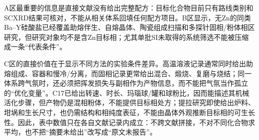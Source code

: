 A区最重要的信息是直接文献没有给出完整配方：目标化合物目前只有路线类别和SCXRD结果可核对，不能从相关体系回填任何配方项目\cite{ababaikeri2024ba5y12zn}。B区显示，无Zn的同类Ba--Y硅酸盐已经覆盖助熔伴生、自熔晶体、陶瓷组成扫描和多探针固相/粉体相区研究，但研究对象均不是含Zn目标相；尤其单批SI未取得的系统筛选不能被压缩成一条“代表条件”\cite{kolitsch2009crystal,wierzbickawieczorek2017high,yamane2024synthesis,yamane2024microstructure,gulay2024navigation}。

C区的直接价值在于显示不同方法的实验条件差异。高温溶液记录通常同时给出助熔组成、容器和慢冷/分离，而固相记录更常给出混合、煅烧、复磨与烧结；同一体系跨气氛时，还必须把挥发损失与副相作为产物信息，而不能把气氛当作孤立的“优化变量”\cite{redhammer2003beta,zou2021crystal,zou2019anti}。C17已给出转速、时长、玛瑙球/罐和球粉比，因而能描述其机械活化步骤，但产物仍是混相粉体，不能提供目标相处方；提拉研究即使给出炉料、坩埚和生长尺寸，也仍需结构和相纯度表征，不能由晶体外观推断目标相的可生长性\cite{tzvetkov2001effects,pang2005study,leonyuk1999high,shoudu1999czochralski}。因此，表中数值只在各自文献记录内成立：不跨文献拼接，不对不同化合物求平均，也不把“摘要未给出”改写成“原文未报告”。
